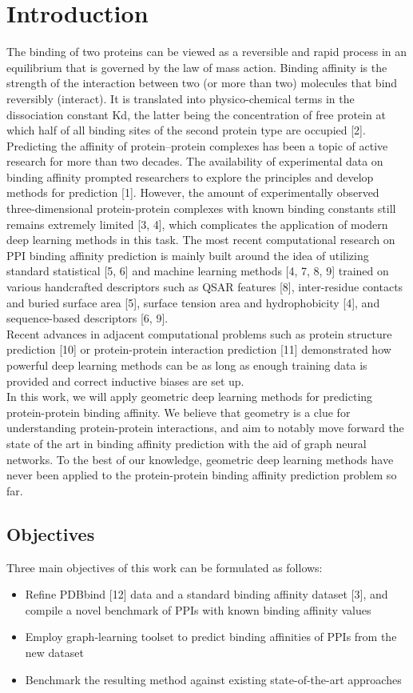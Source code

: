 \section{Introduction}
The binding of two proteins can be viewed as a reversible and rapid process in an equilibrium that is
governed by the law of mass action. Binding affinity is the strength of the interaction between two
(or more than two) molecules that bind reversibly (interact). It is translated into physico-chemical
terms in the dissociation constant Kd, the latter being the concentration of free protein at which
half of all binding sites of the second protein type are occupied [2]. \\
Predicting the affinity of protein–protein complexes has been a topic of active research for more
than two decades. The availability of experimental data on binding affinity prompted researchers to
explore the principles and develop methods for prediction [1]. However, the amount of experimentally
observed three-dimensional protein-protein complexes with known binding constants still remains
extremely limited [3, 4], which complicates the application of modern deep learning methods in this
task. The most recent computational research on PPI binding affinity prediction is mainly built
around the idea of utilizing standard statistical [5, 6] and machine learning methods [4, 7, 8, 9]
trained on various handcrafted descriptors such as QSAR features [8], inter-residue contacts and
buried surface area [5], surface tension area and hydrophobicity [4], and sequence-based descriptors
[6, 9]. \\
Recent advances in adjacent computational problems such as protein structure prediction [10] or
protein-protein interaction prediction [11] demonstrated how powerful deep learning methods can
be as long as enough training data is provided and correct inductive biases are set up. \\
In this work, we will apply geometric deep learning methods for predicting protein-protein binding
affinity. We believe that geometry is a clue for understanding protein-protein interactions, and aim
to notably move forward the state of the art in binding affinity prediction with the aid of graph
neural networks. To the best of our knowledge, geometric deep learning methods have never been
applied to the protein-protein binding affinity prediction problem so far.
\subsection{Objectives}
Three main objectives of this work can be formulated as follows:
\begin{itemize}
\item Refine PDBbind [12] data and a standard binding affinity dataset [3], and compile a novel
benchmark of PPIs with known binding affinity values
\item Employ graph-learning toolset to predict binding affinities of PPIs from the new dataset
\item Benchmark the resulting method against existing state-of-the-art approaches
\end{itemize}


